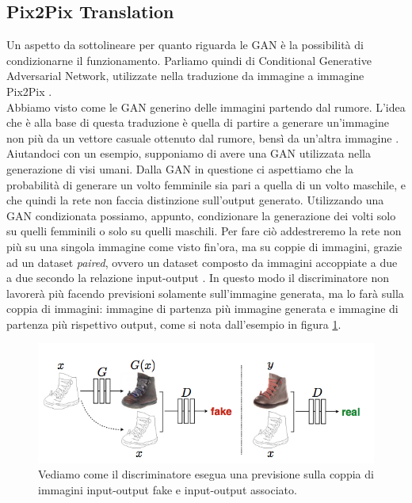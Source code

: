 \subsection{Pix2Pix Translation}
Un aspetto da sottolineare per quanto riguarda le GAN è la possibilità di condizionarne il funzionamento. Parliamo quindi di Conditional Generative Adversarial Network, utilizzate nella traduzione da immagine a immagine Pix2Pix \cite{goodfellow2014generative}.
\\Abbiamo visto come le GAN generino delle immagini partendo dal rumore. L'idea che è alla base di questa traduzione è quella di partire a generare un'immagine non più da un vettore casuale ottenuto dal rumore, bensì da un'altra immagine \cite{isola2018imagetoimage}. Aiutandoci con un esempio, supponiamo di avere una GAN utilizzata nella generazione di visi umani. Dalla GAN in questione ci aspettiamo che la probabilità di generare un volto femminile sia pari a quella di un volto maschile, e che quindi la rete non faccia distinzione sull'output generato. Utilizzando una GAN condizionata possiamo, appunto, condizionare la generazione dei volti solo su quelli femminili o solo su quelli maschili. Per fare ciò addestreremo la rete non più su una singola immagine come visto fin'ora, ma su coppie di immagini, grazie ad un dataset \emph{paired}, ovvero un dataset composto da immagini accoppiate a due a due secondo la relazione input-output \cite{Zhu_2017_ICCV}. In questo modo il discriminatore non lavorerà più facendo previsioni solamente sull'immagine generata, ma lo farà sulla coppia di immagini: immagine di partenza più immagine generata e immagine di partenza più rispettivo output, come si nota dall'esempio in figura \ref{fig:Pix2Pix}.


 \begin{figure}[H]
  \begin{center}
    \includegraphics[width=0.8\columnwidth]{images/pix2pix.png}
  \end{center}
  \caption{Vediamo come il discriminatore esegua una previsione sulla coppia di immagini input-output fake e input-output associato.}
  \label{fig:Pix2Pix}
\end{figure}



